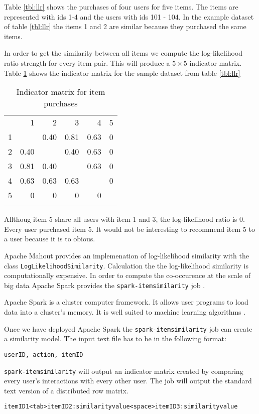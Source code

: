 Table \ref{tbl:llr} shows the purchases of four users for five items. The items are represented with ids 1-4 and the users with ids 101 - 104.
In the example dataset of table \ref{tbl:llr} the items 1 and 2 are similar because they purchased the same items. 

In order to get the similarity between all items we compute the log-likelihood ratio strength for every item pair. This will produce a $5 \times 5$ indicator matrix. Table \ref{tab:indicatormatrix} shows the indicator matrix for the sample dataset from table \ref{tbl:llr}

\begin{table}
  \centering
\begin{center}
\begin{tabular}{rrrrrr}
 & 1 & 2 & 3 & 4 & 5\\
1 &  & 0.40 & 0.81 & 0.63 & 0\\
2 & 0.40 &  & 0.40 & 0.63 & 0\\
3 & 0.81 & 0.40 &  & 0.63 & 0\\
4 & 0.63 & 0.63 & 0.63 &  & 0\\
5 & 0 & 0 & 0 & 0 & \\
 &  &  &  &  & \\
\end{tabular}
\end{center}
  \caption{Indicator matrix for item purchases}
  \label{tab:indicatormatrix}
\end{table}


Allthoug item 5 share all users with item 1 and 3, the log-likelihood ratio is 0. Every user purchased item 5. It would not be interesting to recommend item 5 to a user because it is to obious.

Apache Mahout provides an implemenation of log-likelihood similarity with the class \verb|LogLikelihoodSimilarity|. Calculation the the log-likelihood similarity is computationally expensive. In order to compute the co-occurence at the scale of big data Apache Spark provides the \verb|spark-itemsimilarity| job \cite{Schelter}. 

Apache Spark is a cluster computer framework. It allows user programs to load data into a cluster's memory. It is well suited to machine learning algorithms \cite{Karau}.

Once we have deployed Apache Spark the \verb|spark-itemsimilarity| job can create a similarity model. The input text file has to be in the following format:
\begin{verbatim}
userID, action, itemID
\end{verbatim}
\verb|spark-itemsimilarity| will output an indicator matrix created by comparing every user's interactions with every other user. The job will output the standard text version of a distributed row matrix.
\begin{verbatim}
itemID1<tab>itemID2:similarityvalue<space>itemID3:similarityvalue
\end{verbatim}


